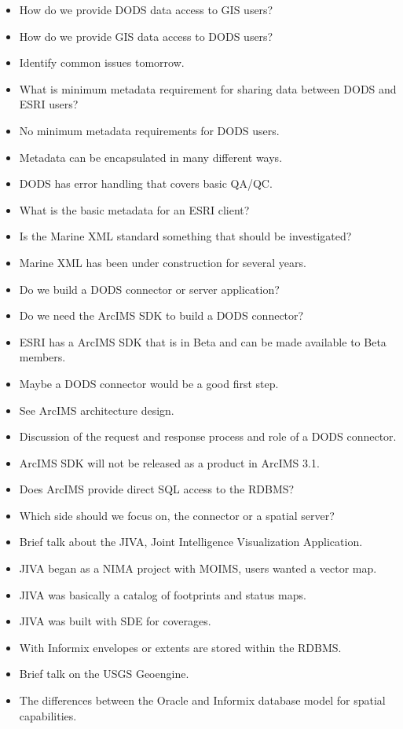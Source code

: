 \begin{itemize}
\item How do we provide DODS data access to GIS users?
\item How do we provide GIS data access to DODS users?
\item Identify common issues tomorrow.
\item What is minimum metadata requirement for sharing data between DODS and ESRI 
users?
\item No minimum metadata requirements for DODS users.
\item Metadata can be encapsulated in many different ways.
\item DODS has error handling that covers basic QA/QC.
\item What is the basic metadata for an ESRI client?
\item Is the Marine XML standard something that should be investigated?
\item Marine XML has been under construction for several years.
\item Do we build a DODS connector or server application?
\item Do we need the ArcIMS SDK to build a DODS connector?
\item ESRI has a ArcIMS SDK that is in Beta and can be made available to Beta members.
\item Maybe a DODS connector would be a good first step.
\item See ArcIMS architecture design.
\item Discussion of the request and response process and role of a DODS connector.
\item ArcIMS SDK will not be released as a product in ArcIMS 3.1.
\item Does ArcIMS provide direct SQL access to the RDBMS?
\item Which side should we focus on, the connector or a spatial server?
\item Brief talk about the JIVA, Joint Intelligence Visualization Application.
\item JIVA began as a NIMA project with MOIMS, users wanted a vector map.
\item JIVA was basically a catalog of footprints and status maps.
\item JIVA was built with SDE for coverages.
\item With Informix envelopes or extents are stored within the RDBMS.
\item Brief talk on the USGS Geoengine.
\item The differences between the Oracle and Informix database model for spatial capabilities.
\end{itemize}


